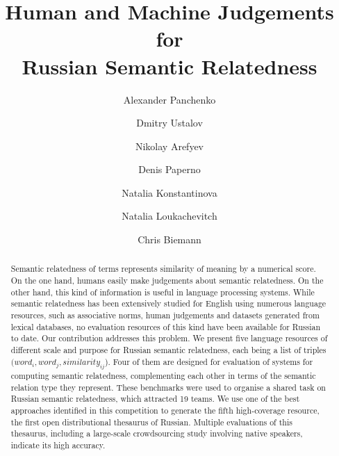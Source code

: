 \documentclass[runningheads,a4paper]{llncs}
\begin{document}
\title{Human and Machine Judgements for\\Russian Semantic Relatedness}


\author{
  Alexander Panchenko \and
  Dmitry Ustalov \and
  Nikolay Arefyev \and
  Denis Paperno \and
  Natalia Konstantinova \and
  Natalia Loukachevitch \and
  Chris Biemann
}



\maketitle

\begin{abstract}
Semantic relatedness of terms represents similarity of meaning by a numerical score. On the one hand, humans easily make judgements about semantic relatedness. On the other hand, this kind of information is useful in language processing systems. While semantic relatedness has been extensively studied for English using numerous language resources, such as associative norms, human judgements and datasets generated from lexical databases, no evaluation resources of this kind have been available for Russian to date. Our contribution addresses this problem. We present five language resources of different scale and purpose for Russian semantic relatedness, each being a list of triples $(\textit{word}_i, \textit{word}_j, \textit{similarity}_{ij}$). Four of them are designed for evaluation of systems for computing  semantic relatedness, complementing each other in terms of the semantic relation type they represent. These benchmarks were used to organise a shared task on Russian semantic relatedness, which attracted 19 teams. We use one of the best approaches identified in this competition to generate the fifth high-coverage resource, the first open distributional thesaurus of Russian. Multiple evaluations of this thesaurus, including a large-scale crowdsourcing study involving native speakers, indicate its high accuracy.
%
\end{abstract}
\end{document}
